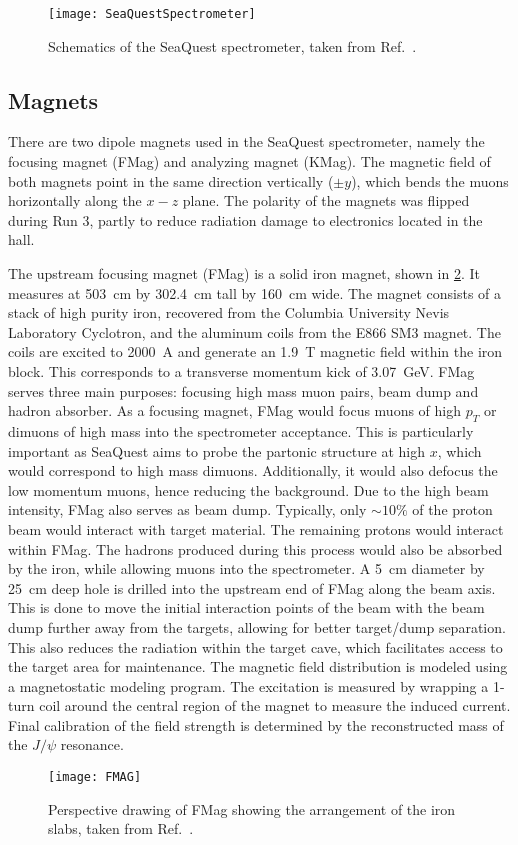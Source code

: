 \documentclass[../main.tex]{subfiles}
\begin{document}
\begin{figure}[htbp!]
	\centering
	\texttt{[image: SeaQuestSpectrometer]}
	\caption{Schematics of the SeaQuest spectrometer, taken from Ref.~\cite{aidala2019}.}
	\label{fig:spectrometer}
\end{figure}

\subsection{Magnets}
There are two dipole magnets used in the SeaQuest spectrometer, namely the focusing
magnet (FMag) and analyzing magnet (KMag). The magnetic field of both magnets point
in the same direction vertically ($\pm y$), which bends the muons horizontally along
the $x-z$ plane. The polarity of the magnets was flipped during Run 3, partly to reduce
radiation damage to electronics located in the hall.

The upstream focusing magnet (FMag) is a solid iron magnet, shown in \cref{fig:fmag}.
It measures at \SI{503}{\cm} by \SI{302.4}{\cm} tall by \SI{160}{\cm} wide.
The magnet consists of a stack of high purity iron, recovered from
the Columbia University Nevis Laboratory Cyclotron, and the aluminum coils from the E866
SM3 magnet. The coils are excited to \SI{2000}{\ampere} and generate an \SI{1.9}{\tesla}
magnetic field within the iron block. This corresponds to a transverse momentum kick of
\SI{3.07}{\GeV}. FMag serves three main purposes: focusing high mass muon pairs, beam
dump and hadron absorber. As a focusing magnet, FMag would focus muons of high $p_T$
or dimuons of high mass into the spectrometer acceptance. This is particularly important as SeaQuest
aims to probe the partonic structure at high $x$, which would correspond to high mass dimuons.
Additionally, it would also defocus the low momentum muons, hence reducing the background.
Due to the high beam intensity, FMag also serves as beam dump. Typically, only $\sim 10\%$
of the proton beam would interact with target material. The remaining protons would interact
within FMag. The hadrons produced during this process would also be absorbed by the iron,
while allowing muons into the spectrometer.
A \SI{5}{\cm} diameter by \SI{25}{\cm} deep hole is drilled into the upstream
end of FMag along the beam axis. This is done to move the initial interaction points
of the beam with the beam dump further away from the targets, allowing for better target/dump
separation. This also reduces the radiation within the target cave, which facilitates
access to the target area for maintenance.
The magnetic field distribution is modeled using a magnetostatic modeling program. The
excitation is measured by wrapping a 1-turn coil around the central region of the magnet to measure the induced
current. Final calibration of the field strength is determined by the reconstructed
mass of the $J/\psi$ resonance.
\begin{figure}[h!]
	\centering
	\texttt{[image: FMAG]}
	\caption{Perspective drawing of FMag showing the arrangement of the iron slabs,
		taken from Ref.~\cite{aidala2019}.}
	\label{fig:fmag}
\end{figure}
\end{document}
